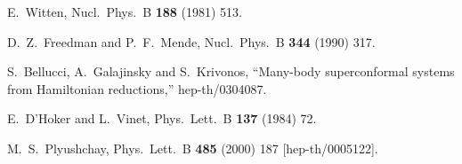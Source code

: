 \documentclass[a4paper,12pt]{article}
\begin{document}
\begin{thebibliography}{99}
E.~Witten,
Nucl.\ Phys.\ B {\bf 188} (1981) 513.


D.~Z.~Freedman and P.~F.~Mende,
Nucl.\ Phys.\ B {\bf 344} (1990) 317.


S.~Bellucci, A.~Galajinsky and S.~Krivonos,
``Many-body superconformal systems from Hamiltonian
reductions,''
hep-th/0304087.


E.~D'Hoker and L.~Vinet,
Phys.\ Lett.\ B {\bf 137} (1984) 72.


M.~S.~Plyushchay,
Phys.\ Lett.\ B {\bf 485} (2000) 187
[hep-th/0005122].

\end{thebibliography}
\end{document}
